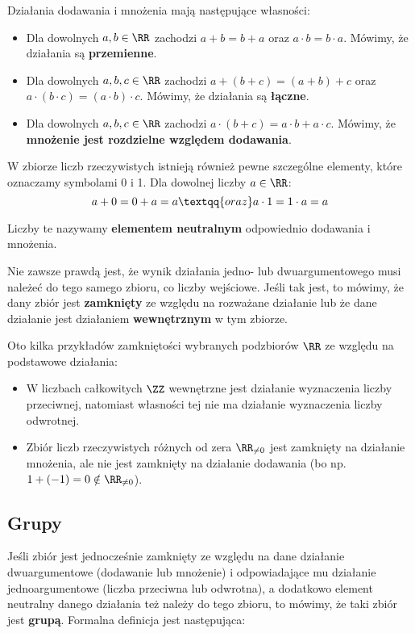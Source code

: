 Działania dodawania i mnożenia mają następujące własności:
\begin{itemize}
    \item Dla dowolnych $a,b\in\RR$ zachodzi $a+b=b+a$ oraz $a\cdot b=b\cdot a$. Mówimy, że działania są \textbf{przemienne}.
    \item Dla dowolnych $a,b,c\in\RR$ zachodzi $a+(b+c)=(a+b)+c$ oraz $a\cdot(b\cdot c)=(a\cdot b)\cdot c$. Mówimy, że działania są \textbf{łączne}.
    \item Dla dowolnych $a,b,c\in\RR$ zachodzi $a\cdot(b+c)=a\cdot b+a\cdot c$. Mówimy, że \textbf{mnożenie jest rozdzielne względem dodawania}.
\end{itemize}

W zbiorze liczb rzeczywistych istnieją również pewne szczególne elementy, które oznaczamy symbolami 0 i 1. Dla dowolnej liczby $a \in \RR$:
$$a + 0 = 0 + a = a \textqq{oraz} a \cdot 1 = 1 \cdot a = a$$

Liczby te nazywamy \textbf{elementem neutralnym} odpowiednio dodawania i mnożenia.
\bigskip

Nie zawsze prawdą jest, że wynik działania jedno- lub dwuargumentowego musi należeć do tego samego zbioru, co liczby wejściowe. Jeśli tak jest, to mówimy, że dany zbiór jest \textbf{zamknięty} ze względu na rozważane działanie lub że dane działanie jest działaniem \textbf{wewnętrznym} w tym zbiorze.

\begin{example}
    Oto kilka przykładów zamkniętości wybranych podzbiorów $\RR$ ze względu na podstawowe działania:
    \begin{itemize}
        \item W liczbach całkowitych $\ZZ$ wewnętrzne jest działanie wyznaczenia liczby przeciwnej, natomiast własności tej nie ma działanie wyznaczenia liczby odwrotnej.
        \item Zbiór liczb rzeczywistych różnych od zera $\RR_{\neq 0}$ jest zamknięty na działanie mnożenia, ale nie jest zamknięty na działanie dodawania (bo np. $1 + (-1) = 0 \notin \RR_{\neq 0}$).
    \end{itemize}
\end{example}

\subsection{Grupy}

Jeśli zbiór jest jednocześnie zamknięty ze względu na dane działanie dwuargumentowe (dodawanie lub mnożenie) i odpowiadające mu działanie jednoargumentowe (liczba przeciwna lub odwrotna), a dodatkowo element neutralny danego działania też należy do tego zbioru, to mówimy, że taki zbiór jest \textbf{grupą}. Formalna definicja jest następująca:

